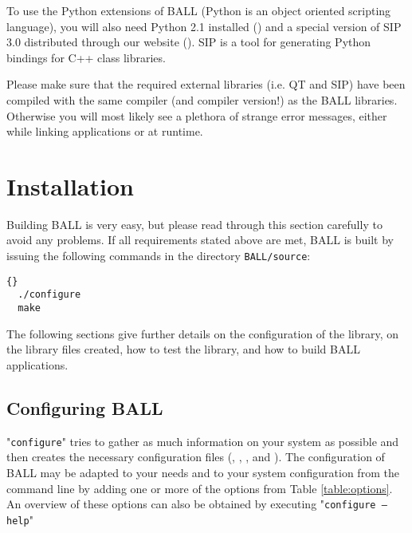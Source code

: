 To use the Python extensions of BALL (Python is an object oriented scripting
language), you will also need Python 2.1 installed
() and a special version of SIP 3.0 distributed through 
our website (). SIP is a tool for
generating Python bindings for C++ class libraries.

Please make sure that the required external \CPP libraries (i.e. QT and SIP)
have been compiled with the same compiler (and compiler version!) as the BALL
libraries. Otherwise you will most likely see a plethora of strange error
messages, either while linking applications or at runtime.

\section{Installation}
\label{section:building-ball}

Building BALL is very easy, but please read through this section carefully to
avoid any problems.  If all requirements stated above are met, BALL is built
by issuing the following commands in the directory {\tt BALL/source}:

\begin{lstlisting}{}
  ./configure
  make
\end{lstlisting}

The following sections give further details on the configuration of the library,
on the library files created, how to test the library, and how to build BALL 
applications.

\subsection{Configuring BALL}

"{\tt configure}" tries to gather as much information on your system as possible and 
then creates the necessary configuration files (,
, , and ).
The configuration of BALL may be adapted to your needs and to your system
configuration from the command line by adding one or more of the options from
Table \ref{table:options}.
An overview of these options can also be obtained by executing "{\tt configure
--help}"

